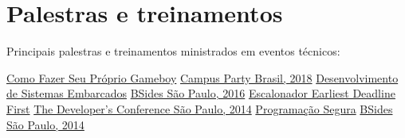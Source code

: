 \documentclass[]{cv-style}          %
\begin{document}
\section{Palestras e treinamentos}
\vspace{-0.3cm}
\begin{entrylist}

\entry
{}
{Principais palestras e treinamentos ministrados em eventos técnicos:}
{}
{\vspace{-0.5cm}}

\entry
{}
{\href{https://www.slideshare.net/rafaelmmoreira/como-fazer-seu-prprio-gameboy-cpbr11}{Como Fazer Seu Próprio Gameboy}}
{\href{https://campuse.ro/events/campus-party-brasil-2018/workshop/como-fazer-seu-proprio-gameboy-cpbr11/}{Campus Party Brasil, 2018}}
{\vspace{-0.5cm}}
\entry
{}
{\href{https://www.slideshare.net/rafaelmmoreira/desenvolvimento-de-sistemas-embarcados-do-hardware-ao-software}{Desenvolvimento de Sistemas Embarcados}}
{\href{https://sp13.securitybsides.com.br/detalhe-dos-treinamentos-e-apresentacoes/}{BSides São Paulo, 2016}}
{\vspace{-0.5cm}}
\entry
{}
{\href{https://www.slideshare.net/rafaelmmoreira/escalonador-earliest-deadline-first-tdc2014sp}{Escalonador Earliest Deadline First}}
{\href{https://thedevconf.com/tdc/2014/saopaulo/trilha-embedded}{The Developer's Conference São Paulo, 2014}}
{\vspace{-0.5cm}}
\entry
{}
{\href{https://www.slideshare.net/rafaelmmoreira/programao-segura}{Programação Segura}}
{\href{https://garoa.net.br/wiki/O_Outro_Lado_BSidesSP_ed_naovaitercopa/Lightning_Talks}{BSides São Paulo, 2014}}
{\vspace{-0.5cm}}

\end{entrylist}
{\vspace{-0.2cm}}
\end{document}
